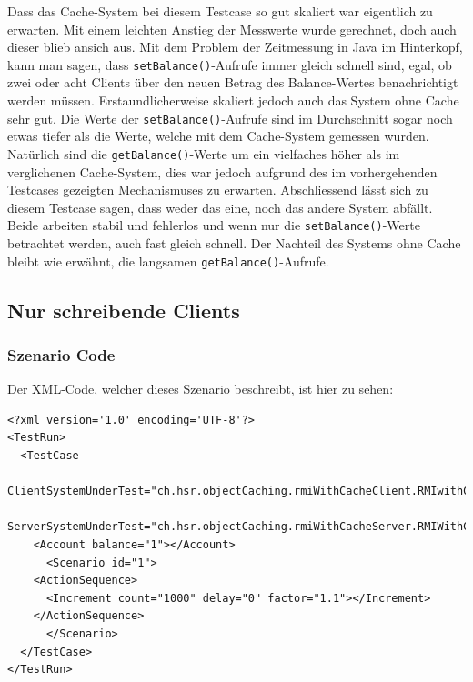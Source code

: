 Dass das Cache-System bei diesem Testcase so gut ska\-liert war eigentlich zu erwarten. Mit einem leichten An\-s\-tieg der Mess\-werte wurde gerechnet, doch auch dieser blieb ansich aus. Mit dem Pro\-blem der Zeit\-messung in Java im Hinter\-kopf, kann man sagen, dass \texttt{setBalance()}-Aufrufe immer gleich schnell sind, egal, ob zwei oder acht Clients über den neuen Betrag des Balance-Wertes benachrichtigt werden müssen.\newline
Erstaundlicherweise skaliert jedoch auch das System ohne Cache sehr gut. Die Werte der \texttt{setBalance()}-Aufrufe sind im Durch\-schnitt sogar noch etwas tiefer als die Werte, welche mit dem Cache-System gemessen wurden. Natürlich sind die \texttt{getBalance()}-Werte um ein vielfaches höher als im verglichenen Cache-System, dies war jedoch aufgrund des im vorhergehenden Testcases gezeigten Mechanismuses zu erwarten.\newline
Abschliessend lässt sich zu diesem Testcase sagen, dass weder das eine, noch das andere System abfällt. Beide arbeiten stabil und fehlerlos und wenn nur die \texttt{setBalance()}-Werte betrachtet werden, auch fast gleich schnell. Der Nachteil des Systems ohne Cache bleibt wie erwähnt, die langsamen \texttt{getBalance()}-Aufrufe.

\subsection{Nur schreibende Clients}
\subsubsection{Szenario Code}
Der XML-Code, welcher dieses Szenario beschreibt, ist hier zu sehen:
\begin{lstlisting}
<?xml version='1.0' encoding='UTF-8'?>
<TestRun>
  <TestCase
    ClientSystemUnderTest="ch.hsr.objectCaching.rmiWithCacheClient.RMIwithCacheClientSystem"
    ServerSystemUnderTest="ch.hsr.objectCaching.rmiWithCacheServer.RMIWithCacheServerSystem">
    <Account balance="1"></Account>
      <Scenario id="1">
	<ActionSequence>
	  <Increment count="1000" delay="0" factor="1.1"></Increment>
	</ActionSequence>
      </Scenario>
  </TestCase>
</TestRun>
\end{lstlisting}

